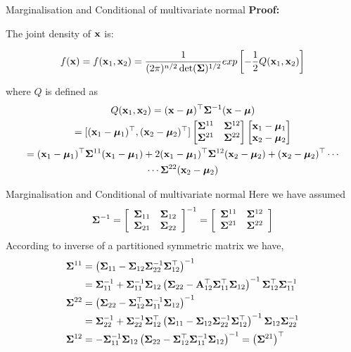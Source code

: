 \documentclass{beamer}
\begin{document}
\begin{frame}{Marginalisation and Conditional of multivariate normal}
	\textbf{Proof:}
	
	The joint density of ${\vx}$ is:
	
	\begin{equation}
	f({\vx})=f(\vx_1,\vx_2)=\frac{1}{(2\pi)^{n/2}\det(\mSigma)^{1/2}}exp\left[-\frac{1}{2}Q(\vx_1,\vx_2)\right] 
	\end{equation}
	
	where $Q$ is defined as
    \small
	\begin{gather}
	Q(\vx_1,\vx_2) = ({\vx}-\vmu)\tp\mSigma\inv({\vx}-\vmu)\\
	= [(\vx_1-\vmu_1)\tp, (\vx_2-\vmu_2)\tp] 
	\begin{bmatrix}
	\mSigma^{11} & \mSigma^{12}\\
	\mSigma^{21} & \mSigma^{22}
	\end{bmatrix}
	\begin{bmatrix}
	\vx_1-\vmu_1 \\
	\vx_2-\vmu_2
	\end{bmatrix}\\
	= (\vx_1-\vmu_1)\tp\mSigma^{11}(\vx_1-\vmu_1)+ 2(\vx_1-\vmu_1)\tp\mSigma^{12}(\vx_2-\vmu_2) + (\vx_2-\vmu_2)\tp \cdots \\
	\cdots \mSigma^{22}(\vx_2-\vmu_2)
	\end{gather}
\end{frame}

\begin{frame}{Marginalisation and Conditional of multivariate normal}
Here we have assumed 
$$	
\mSigma\inv=\left[\begin{array}{cc}
{\mSigma_{11}} & {\mSigma_{12}} \\
{\mSigma_{21}} & {\mSigma_{22}}
\end{array}\right]\inv=\left[\begin{array}{cc}
{\mSigma^{11}} & {\mSigma^{12}} \\
{\mSigma^{21}} & {\mSigma^{22}}
\end{array}\right]
$$
According to inverse of a partitioned symmetric matrix we have, 
\begin{align*}
\mSigma^{11}&=\left(\mSigma_{11}-\mSigma_{12} \mSigma_{22}\inv \mSigma_{12}\tp\right)\inv \\
&=\mSigma_{11}\inv+\mSigma_{11}\inv \mSigma_{12}\left(\mSigma_{22}-\mA_{12}\tp \mSigma_{11}\tp \mSigma_{12}\right)\inv \mSigma_{12}\tp \mSigma_{11}\inv \\
\mSigma^{22}&=\left(\mSigma_{22}-\mSigma_{12}\tp \mSigma_{11}\inv \mSigma_{12}\right)\inv \\
&=\mSigma_{22}\inv+\mSigma_{22}\inv \mSigma_{12}\tp\left(\mSigma_{11}-\mSigma_{12} \mSigma_{22}\inv \mSigma_{12}\tp\right)\inv \mSigma_{12} \mSigma_{22}\inv \\
\mSigma^{12}&=-\mSigma_{11}\inv \mSigma_{12}\left(\mSigma_{22}-\mSigma_{12}\tp \mSigma_{11}\inv \mSigma_{12}\right)\inv=\left(\mSigma^{21}\right)\tp
\end{align*}
	
\end{frame}
\end{document}
